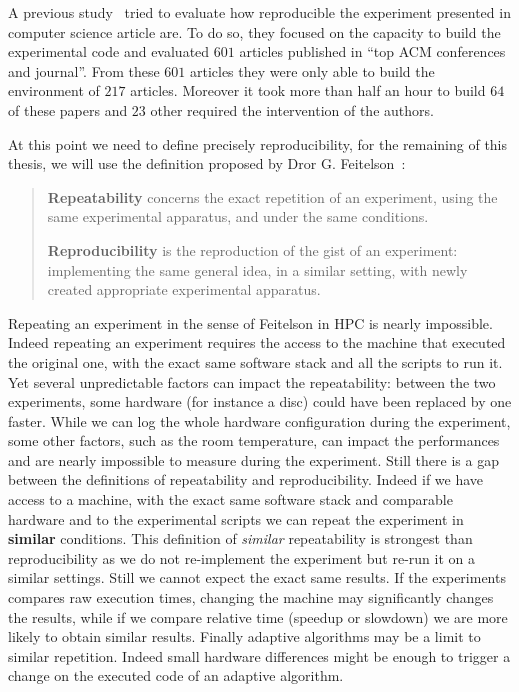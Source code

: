 A previous study~\cite{Collberg15Repeatability} tried to evaluate how reproducible the experiment presented in computer science article are.
To do so, they focused on the capacity to build the experimental code and evaluated $601$ articles published in “top ACM conferences and journal”.
From these $601$ articles they were only able to build the environment of $217$ articles.
Moreover it took more than half an hour to build $64$ of these papers and $23$ other required the intervention of the authors.

At this point we need to define precisely reproducibility, for the remaining of this thesis, we will use the definition proposed by Dror G. Feitelson~\cite{Feitelson15From}:

\begin{quote}
    \textbf{Repeatability} concerns the exact repetition of an experiment, using the same experimental apparatus, and under the same conditions.

    \textbf{Reproducibility} is the reproduction of the gist of an experiment: implementing the same general idea, in a similar setting, with newly created appropriate experimental apparatus.
\end{quote}

Repeating an experiment in the sense of Feitelson in \gls{HPC} is nearly impossible.
Indeed repeating an experiment requires the access to the machine that executed the original one, with the exact same software stack and all the scripts to run it.
Yet several unpredictable factors can impact the repeatability: between the two experiments, some hardware (for instance a disc) could have been replaced by one faster.
While we can log the whole hardware configuration during the experiment, some other factors, such as the room temperature, can impact the performances and are nearly impossible to measure during the experiment.
Still there is a gap between the definitions of repeatability and reproducibility.
Indeed if we have access to a machine, with the exact same software stack and comparable hardware and to the experimental scripts we can repeat the experiment in \textbf{similar} conditions.
This definition of \emph{similar} repeatability is strongest than reproducibility as we do not re-implement the experiment but re-run it on a similar settings.
Still we cannot expect the exact same results.
If the experiments compares raw execution times, changing the machine may significantly changes the results, while if we compare relative time (speedup or slowdown) we are more likely to obtain similar results.
Finally adaptive algorithms may be a limit to similar repetition.
Indeed small hardware differences might be enough to trigger a change on the executed code of an adaptive algorithm.

